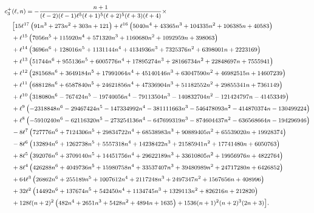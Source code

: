 \documentclass[11pt]{article}
\numberwithin{equation}{section}
\begin{document}
\begin{equation}\footnotesize
\begin{aligned}
c_3^+&(\ell,n)=-\frac{n+1}{(\ell-2) (\ell-1) \ell^5 (\ell+1)^5 (\ell+2)^5 (\ell+3) (\ell+4)}\times\\
&\bigl[15 \ell^{17} \left(91 n^3+273 n^2+303 n+121\right)+\ell^{16} \left(5040 n^4+43365 n^3+104335 n^2+106385 n+40583\right)\\
&+\ell^{15} \left(7056 n^5+115920 n^4+571320 n^3+1160680 n^2+1092959 n+398063\right)\\
&+\ell^{14} \left(3696 n^6+128016 n^5+1131144 n^4+4134936 n^3+7325376 n^2+6398001 n+2223169\right)\\
&+\ell^{13} \left(51744 n^6+955136 n^5+6005776 n^4+17895274 n^3+28166734 n^2+22848697 n+7555941\right)\\
&+\ell^{12} \left(281568 n^6+3649184 n^5+17991064 n^4+45140146 n^3+63047590 n^2+46982515 n+14607239\right)\\
&+\ell^{11} \left(688128 n^6+6587840 n^5+24621856 n^4+47336904 n^3+51182552 n^2+29855341 n+7361149\right)\\
&+\ell^{10} \left(318080 n^6-767424 n^5-19740056 n^4-79113504 n^3-140832704 n^2-121424797 n-41453349\right)\\
&+\ell^9 \left(-2318848 n^6-29467424 n^5-147334992 n^4-381111663 n^3-546478093 n^2-414870374 n-130499224\right)\\
&+\ell^8 \left(-5910240 n^6-62116320 n^5-273254136 n^4-647699319 n^3-874604437 n^2-636568664 n-194296946\right)\\
&-8 \ell^7 \left(727776 n^6+7124306 n^5+29834722 n^4+68538983 n^3+90889405 n^2+65539020 n+19928374\right)\\
&-8 \ell^6 \left(132894 n^6+1262738 n^5+5557318 n^4+14238422 n^3+21585941 n^2+17741480 n+6050763\right)\\
&+8 \ell^5 \left(392076 n^6+3709140 n^5+14451756 n^4+29622189 n^3+33610805 n^2+19956976 n+4822764\right)\\
&+8 \ell^4 \left(426288 n^6+4049736 n^5+15980758 n^4+33537407 n^3+39480989 n^2+24717280 n+6426852\right)\\
&+64 \ell^3 \left(26862 n^6+255189 n^5+1007612 n^4+2117248 n^3+2497347 n^2+1567656 n+408996\right)\\
&+32 \ell^2 \left(14492 n^6+137674 n^5+542450 n^4+1134745 n^3+1329113 n^2+826216 n+212820\right)\\
&+128 \ell (n+2)^2 \left(482 n^4+2651 n^3+5428 n^2+4894 n+1635\right)+1536 (n+1)^2 (n+2)^3 (2 n+3)\bigr].
\end{aligned}
\end{equation}
\end{document}
